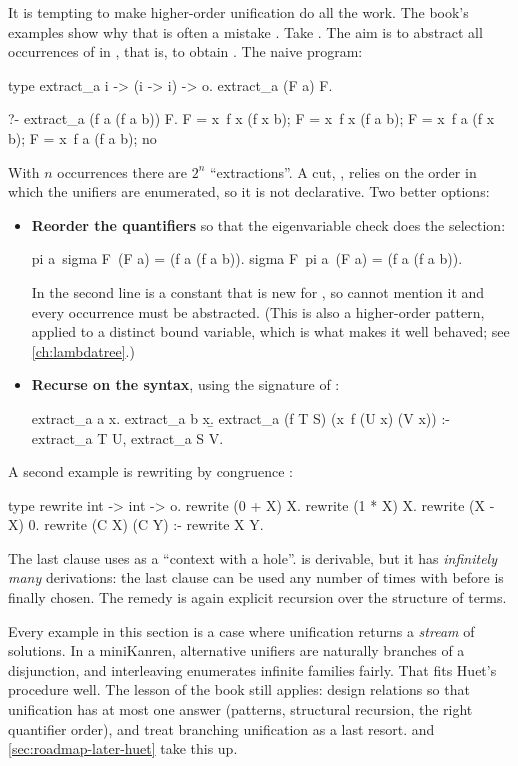 It is tempting to make higher-order unification do all the work. The book's examples show why that is
often a mistake . Take . The aim is to
abstract all occurrences of  in , that is, to obtain . The
naive program:
\begin{lprolog}
type extract_a  i -> (i -> i) -> o.
extract_a (F a) F.

?- extract_a (f a (f a b)) F.
F = x\ f x (f x b);
F = x\ f x (f a b);
F = x\ f a (f x b);
F = x\ f a (f a b);
no
\end{lprolog}
With $n$ occurrences there are $2^n$ ``extractions''. A cut, , relies on the
order in which the unifiers are enumerated, so it is not declarative. Two better options:
\begin{itemize}
\item \textbf{Reorder the quantifiers} so that the eigenvariable check does the selection:
\begin{lprolog}
pi a\ sigma F\ (F a) = (f a (f a b)).   %
sigma F\ pi a\ (F a) = (f a (f a b)).   %
\end{lprolog}
In the second line  is a constant that is new for , so  cannot mention it and every
occurrence must be abstracted. (This is also a higher-order pattern,  applied to a distinct bound
variable, which is what makes it well behaved; see \cref{ch:lambdatree}.)
\item \textbf{Recurse on the syntax}, using the signature of :
\begin{lprolog}
extract_a a x\x.
extract_a b x\b.
extract_a (f T S) (x\ f (U x) (V x)) :- extract_a T U, extract_a S V.
\end{lprolog}
\end{itemize}
A second example is rewriting by congruence :
\begin{lprolog}
type rewrite  int -> int -> o.
rewrite (0 + X) X.
rewrite (1 * X) X.
rewrite (X - X) 0.
rewrite (C X) (C Y) :- rewrite X Y.
\end{lprolog}
The last clause uses  as a ``context with a hole''.  is derivable,
but it has \emph{infinitely many} derivations: the last clause can be used any number of times with
 before  is finally chosen. The remedy is again explicit recursion over the
structure of terms.

\begin{kanren}
Every example in this section is a case where unification returns a \emph{stream} of solutions. In a
miniKanren, alternative unifiers are naturally branches of a disjunction, and interleaving enumerates
infinite families fairly. That fits Huet's procedure \cite{Huet1975} well. The lesson of the book still
applies: design relations so that unification has at most one answer (patterns, structural recursion, the
right quantifier order), and treat branching unification as a last resort.  and
\cref{sec:roadmap-later-huet} take this up.
\end{kanren}

